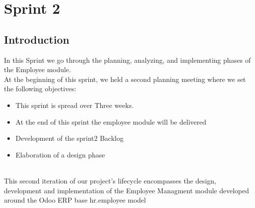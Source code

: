 \chapter{Sprint 2}
	
\section*{Introduction}
   In this Sprint we go through the planning, analyzing, and implementing phases of the Employee module.\\
   At the beginning of this sprint, we held a second planning meeting where we set the following objectives:

\begin{itemize}
\item This sprint is spread over Three weeks.
\item At the end of this sprint the employee module will be delivered
\item Development of the sprint2 Backlog
\item Elaboration of a design phase
\end{itemize}
\\
This second iteration of our project's lifecycle encompasses the design, development and implementation of the Employee Managment module developed around the Odoo ERP base hr.employee model
